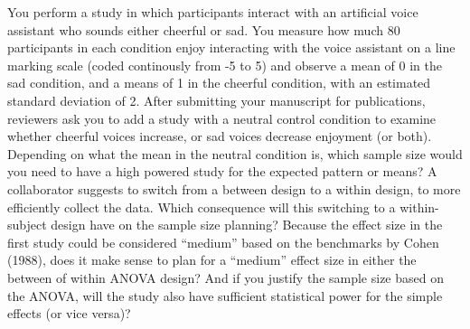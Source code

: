 \documentclass[,man,floatsintext]{apa6}
\begin{document}
You perform a study in which participants interact with an artificial
voice assistant who sounds either cheerful or sad. You measure how much
80 participants in each condition enjoy interacting with the voice
assistant on a line marking scale (coded continously from -5 to 5) and
observe a mean of 0 in the sad condition, and a means of 1 in the
cheerful condition, with an estimated standard deviation of 2. After
submitting your manuscript for publications, reviewers ask you to add a
study with a neutral control condition to examine whether cheerful
voices increase, or sad voices decrease enjoyment (or both). Depending
on what the mean in the neutral condition is, which sample size would
you need to have a high powered study for the expected pattern or means?
A collaborator suggests to switch from a between design to a within
design, to more efficiently collect the data. Which consequence will
this switching to a within-subject design have on the sample size
planning? Because the effect size in the first study could be considered
\enquote{medium} based on the benchmarks by Cohen (1988), does it make
sense to plan for a \enquote{medium} effect size in either the between
of within ANOVA design? And if you justify the sample size based on the
ANOVA, will the study also have sufficient statistical power for the
simple effects (or vice versa)?
\end{document}

